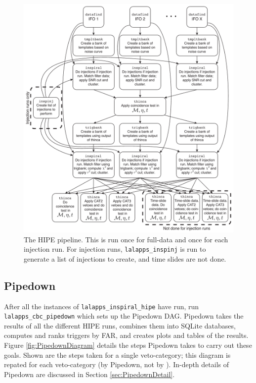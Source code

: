\begin{figure}[p]
\begin{center}
\includegraphics[width=6in]{figures/HIPEDiagram.pdf}
\end{center}
\caption{
The \ac{HIPE} pipeline. This is run once for full-data and once for
each injection run. For injection runs, \texttt{lalapps\_inspinj} is run to
generate a list of injections to create, and time slides are not done.
}
\label{fig:HIPEDiagram}
\end{figure}

\subsection{Pipedown}
\label{sec:pipedown_overview}

After all the instances of \texttt{lalapps\_inspiral\_hipe} have run, \ihope
run \texttt{lalapps\_cbc\_pipedown} which sets up the Pipedown \ac{DAG}.
Pipedown takes the results of all the different HIPE runs, combines them into
SQLite databases, computes and ranks triggers by \ac{FAR}, and creates plots
and tables of the results. Figure \ref{fig:PipedownDiagram} details the steps
Pipedown takes to carry out these goals. Shown are the steps taken for a single
veto-category; this diagram is repated for each veto-category (by Pipedown, not
by \ihope). In-depth details of Pipedown are discussed in Section
\ref{sec:PipedownDetail}.

